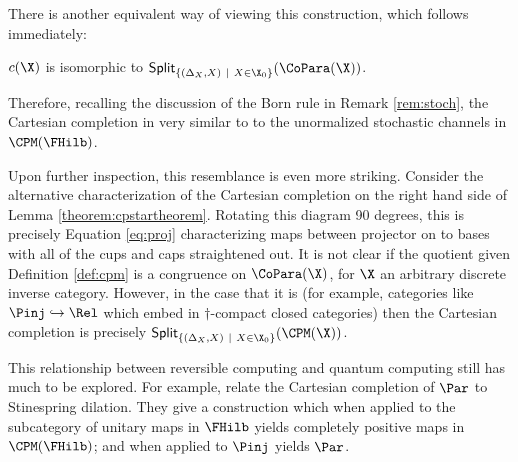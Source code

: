 There is another equivalent way of viewing this construction, which follows immediately:
\begin{corollary}
$c(\X)$ is isomorphic to ${\sf Split}_{\{(\Delta_X,X)\ | \ X \in \X_0 \}}(\CoPara(\X))$.
\end{corollary}
Therefore, recalling the discussion of the Born rule in Remark \ref{rem:stoch}, the Cartesian completion in very similar to to the  unormalized stochastic channels in $\CPM(\FHilb)$. 


Upon further inspection, this resemblance is even more striking. Consider the alternative characterization of the Cartesian completion on the right hand side of Lemma \ref{theorem:cpstartheorem}.  Rotating this diagram 90 degrees, this is precisely Equation \ref{eq:proj} characterizing maps between projector on to bases with all of the cups and caps straightened out.  It is not clear if the quotient given Definition \ref{def:cpm} is a congruence on $\CoPara(\X)$, for $\X$ an arbitrary discrete inverse category.  However, in the case that it is (for example, categories like $\Pinj\hookrightarrow\Rel$ which embed in $\dag$-compact closed categories) then the Cartesian completion is precisely  ${\sf Split}_{\{(\Delta_X,X)\ | \ X \in \X_0 \}}(\CPM(\X))$.


This relationship between reversible computing and quantum computing still has much to be explored.  For example, \cite{Kaarsgaard} relate the Cartesian completion of $\Par$ to Stinespring dilation. They give a construction which when applied to the subcategory of unitary maps in $\FHilb$  yields completely positive maps in $\CPM(\FHilb)$; and when applied to $\Pinj$ yields $\Par$.
